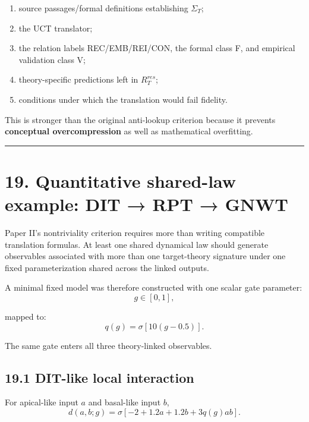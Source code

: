 \documentclass[
  11pt,
  a4paper,
]{article}
\providecommand{\tightlist}{%
  \setlength{\itemsep}{0pt}\setlength{\parskip}{0pt}}
\begin{document}
\begin{enumerate}
\def\labelenumi{\arabic{enumi}.}
\tightlist
\item
  source passages/formal definitions establishing \(\Sigma_T\);
\item
  the UCT translator;
\item
  the relation labels REC/EMB/REI/CON, the formal class F, and empirical
  validation class V;
\item
  theory-specific predictions left in \(R_T^{res}\);
\item
  conditions under which the translation would fail fidelity.
\end{enumerate}

This is stronger than the original anti-lookup criterion because it
prevents \textbf{conceptual overcompression} as well as mathematical
overfitting.

\begin{center}\rule{0.5\linewidth}{0.5pt}\end{center}

\hypertarget{quantitative-shared-law-example-dit-rpt-gnwt}{%
\section{19. Quantitative shared-law example: DIT → RPT →
GNWT}\label{quantitative-shared-law-example-dit-rpt-gnwt}}

Paper II's nontriviality criterion requires more than writing compatible
translation formulas. At least one shared dynamical law should generate
observables associated with more than one target-theory signature under
one fixed parameterization shared across the linked outputs.

A minimal fixed model was therefore constructed with one scalar gate
parameter:
\nopagebreak[4]
\[
g\in[0,1],
\]

mapped to:
\nopagebreak[4]
\[
q(g)=\sigma[10(g-0.5)].
\]

The same gate enters all three theory-linked observables.

\hypertarget{dit-like-local-interaction}{%
\subsection{19.1 DIT-like local
interaction}\label{dit-like-local-interaction}}

For apical-like input \(a\) and basal-like input \(b\),
\nopagebreak[4]
\[
d(a,b;g)
=
\sigma[-2+1.2a+1.2b+3q(g)ab].
\]
\end{document}
